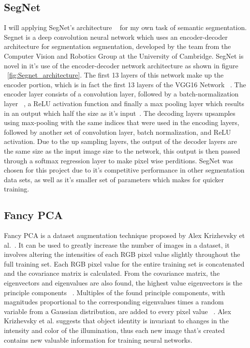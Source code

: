 \documentclass[10pt,twocolumn,letterpaper]{article}
\begin{document}
\subsection{SegNet}

I will applying SegNet's architecture ~\cite{DBLP:journals/corr/BadrinarayananK15} for my own task of semantic segmentation. Segnet is a deep convolution neural network which uses an encoder-decoder architecture for segmentation segmentation, developed by the team from the Computer Vision and Robotics Group at the University of Cambridge. SegNet
is novel in it's use of the encoder-decoder network architecture as shown in figure ~\ref{fig:Segnet_architecture}. The first 13 layers of this network make up the encoder portion, which is in fact
the first 13 layers of the VGG16 Network ~\cite{DBLP:journals/corr/SimonyanZ14a}. The encoder layer consists of a convolution layer, followed by a batch-normalization layer ~\cite{DBLP:journals/corr/IoffeS15}, a ReLU activation function and finally a max pooling layer which results in an output which half the size as it's input~\cite{DBLP:journals/corr/BadrinarayananK15}. The decoding layers upsamples using max-pooling with
the same indices that were used in the encoding layers, followed by another set of convolution layer, batch normalization, and ReLU activation. Due to the up sampling layers, the output of the decoder layers are the same size as the input image size to the network, this output is then passed through a softmax regression layer to
make pixel wise perditions. SegNet was chosen for this project due to it's competitive performance in other 
segmentation data sets, as well as it's smaller set of parameters which makes for quicker training.

\subsection{Fancy PCA}
Fancy PCA is a dataset augmentation technique proposed by Alex Krizhevsky et al.~\cite{NIPS2012_4824}. It can be used to greatly increase the number of images in a dataset, it involves altering the intensities of each RGB pixel value slightly throughout the full training set. Each RGB pixel value for the entire training set is concatenated and the covariance matrix is calculated. From the covariance matrix, the eigenvectors and eigenvalues are also found, the highest value eigenvectors is the principle components ~\cite{FancyPCA}. Multiples of the found principle components, with magnitudes proportional to the corresponding eigenvalues times a random variable from a Gaussian distribution, are added to every pixel value ~\cite{NIPS2012_4824}.  Alex Krizhevsky et al. suggests that object identity is invariant to changes in the intensity and color of the illumination, thus each new image that's created contains new valuable information for training neural networks.
\end{document}
